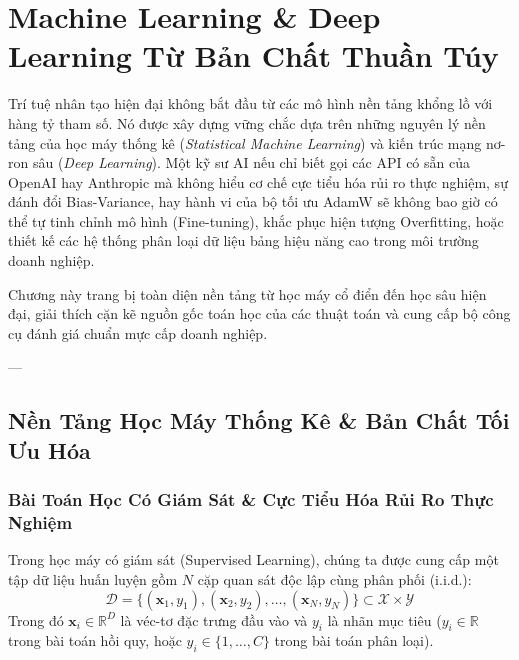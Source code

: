 
\chapter{Machine Learning \& Deep Learning Từ Bản Chất Thuần Túy}
\label{ch:machine-learning-deepdive}

Trí tuệ nhân tạo hiện đại không bắt đầu từ các mô hình nền tảng khổng lồ với hàng tỷ tham số. Nó được xây dựng vững chắc dựa trên những nguyên lý nền tảng của học máy thống kê (\textit{Statistical Machine Learning}) và kiến trúc mạng nơ-ron sâu (\textit{Deep Learning}). Một kỹ sư AI nếu chỉ biết gọi các API có sẵn của OpenAI hay Anthropic mà không hiểu cơ chế cực tiểu hóa rủi ro thực nghiệm, sự đánh đổi Bias-Variance, hay hành vi của bộ tối ưu AdamW sẽ không bao giờ có thể tự tinh chỉnh mô hình (Fine-tuning), khắc phục hiện tượng Overfitting, hoặc thiết kế các hệ thống phân loại dữ liệu bảng hiệu năng cao trong môi trường doanh nghiệp.

Chương này trang bị toàn diện nền tảng từ học máy cổ điển đến học sâu hiện đại, giải thích cặn kẽ nguồn gốc toán học của các thuật toán và cung cấp bộ công cụ đánh giá chuẩn mực cấp doanh nghiệp.

---

\section{Nền Tảng Học Máy Thống Kê \& Bản Chất Tối Ưu Hóa}
\label{sec:statistical-ml-foundations}

\subsection{Bài Toán Học Có Giám Sát \& Cực Tiểu Hóa Rủi Ro Thực Nghiệm}
Trong học máy có giám sát (Supervised Learning), chúng ta được cung cấp một tập dữ liệu huấn luyện gồm $N$ cặp quan sát độc lập cùng phân phối (i.i.d.):
\begin{equation}
\mathcal{D} = \{(\mathbf{x}_1, y_1), (\mathbf{x}_2, y_2), \dots, (\mathbf{x}_N, y_N)\} \subset \mathcal{X} \times \mathcal{Y}
\end{equation}
Trong đó $\mathbf{x}_i \in \mathbb{R}^D$ là véc-tơ đặc trưng đầu vào và $y_i$ là nhãn mục tiêu ($y_i \in \mathbb{R}$ trong bài toán hồi quy, hoặc $y_i \in \{1, \dots, C\}$ trong bài toán phân loại).

